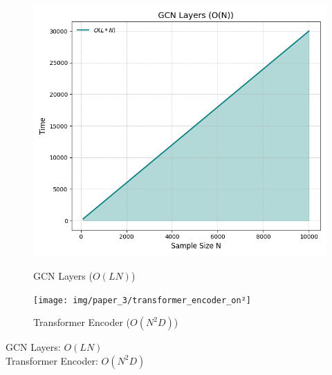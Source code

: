 \begin{figure}[H]
	\centering
	\begin{minipage}[b]{0.40\linewidth}
		\centering
		\includegraphics[width=\linewidth]{img/paper_3/gcn_layers_on}
		\caption{GCN Layers (\(O(LN)\))}
		\label{fig:gcnlayerson}
	\end{minipage}
	\hfill
	\begin{minipage}[b]{0.40\linewidth}
		\centering
		\texttt{[image: img/paper\_3/transformer\_encoder\_on²]}
		\caption{Transformer Encoder (\(O(N^2D)\))}
		\label{fig:transformerencoderon2}
	\end{minipage}
\end{figure}

\noindent GCN Layers: \(O(LN)\) \\
Transformer Encoder: \(O(N^2D)\)

